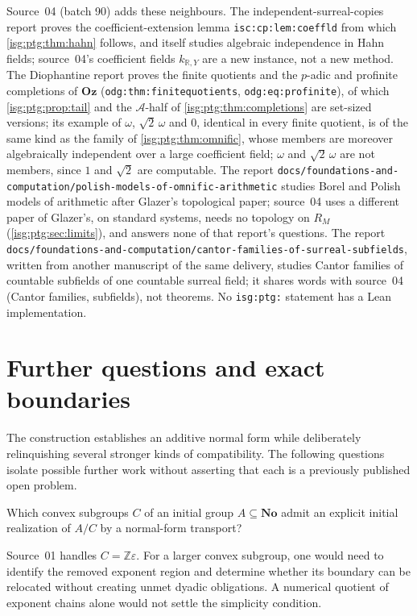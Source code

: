 \documentclass[11pt]{article}
\theoremstyle{definition}
\theoremstyle{remark}
\newcommand{\No}{\ensuremath{\mathbf{No}}}
\newcommand{\Oz}{\ensuremath{\mathbf{Oz}}}
\newcommand{\R}{\mathbb{R}}
\newcommand{\Z}{\mathbb{Z}}
\newcommand{\Asc}{\mathcal{A}}
\newcommand{\replabel}[1]{\nolinkurl{#1}}
\begin{document}
Source~04 (batch 90) adds these neighbours. The independent-surreal-copies
report proves the coefficient-extension lemma
\replabel{isc:cp:lem:coeffld} from which \cref{isg:ptg:thm:hahn} follows,
and itself studies algebraic independence in Hahn fields;
source~04's coefficient fields $k_{\R,Y}$ are a new instance, not a new
method. The Diophantine report proves the finite quotients and the
$p$-adic and profinite completions of $\Oz$
(\replabel{odg:thm:finitequotients}, \replabel{odg:eq:profinite}), of which
\cref{isg:ptg:prop:tail} and the $\Asc$-half of
\cref{isg:ptg:thm:completions} are set-sized versions; its example of
$\omega$, $\sqrt2\,\omega$ and $0$, identical in every finite quotient, is
of the same kind as the family of \cref{isg:ptg:thm:omnific}, whose
members are moreover algebraically independent over a large coefficient
field; $\omega$ and $\sqrt2\,\omega$ are not members, since $1$ and
$\sqrt2$ are computable. The report
\nolinkurl{docs/foundations-and-computation/polish-models-of-omnific-arithmetic}
studies Borel and Polish models of arithmetic after Glazer's topological
paper; source~04 uses a different paper of Glazer's, on standard systems,
needs no topology on $R_M$ (\cref{isg:ptg:sec:limits}), and answers none
of that report's questions. The report
\nolinkurl{docs/foundations-and-computation/cantor-families-of-surreal-subfields},
written from another manuscript of the same delivery, studies Cantor
families of countable subfields of one countable surreal field; it shares
words with source~04 (Cantor families, subfields), not theorems. No
\texttt{isg:ptg:} statement has a Lean implementation.

\section{Further questions and exact boundaries}\label{isg:sec:further}

The construction establishes an additive normal form while deliberately
relinquishing several stronger kinds of compatibility. The following
questions isolate possible further work without asserting that each is
a previously published open problem.

\begin{question}\label{isg:q:convex}
Which convex subgroups $C$ of an initial group $A\subseteq\No$ admit
an explicit initial realization of $A/C$ by a normal-form transport?
\end{question}
Source~01 handles $C=\Z\varepsilon$. For a larger convex subgroup,
one would need to identify the removed exponent region and determine
whether its boundary can be relocated without creating unmet dyadic
obligations. A numerical quotient of exponent chains alone would not
settle the simplicity condition.
\end{document}
